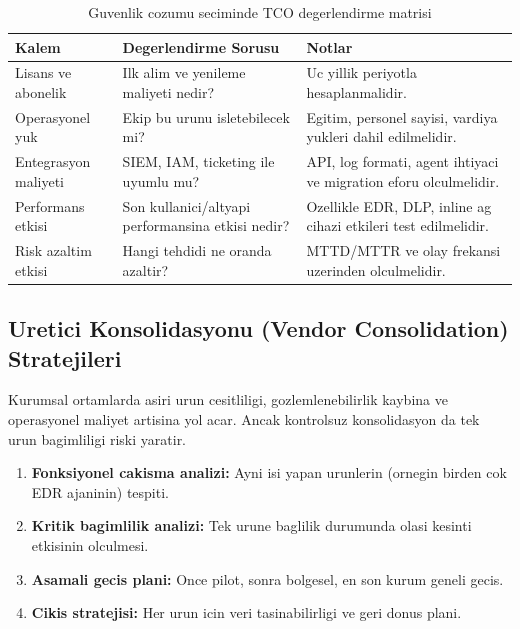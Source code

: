 \begin{table}[htbp]
\centering
\caption{Guvenlik cozumu seciminde TCO degerlendirme matrisi}
\begin{tabular}{|p{3.2cm}|p{4.6cm}|p{6.2cm}|}
\hline
\textbf{Kalem} & \textbf{Degerlendirme Sorusu} & \textbf{Notlar} \\
\hline
Lisans ve abonelik & Ilk alim ve yenileme maliyeti nedir? & Uc yillik periyotla hesaplanmalidir. \\
\hline
Operasyonel yuk & Ekip bu urunu isletebilecek mi? & Egitim, personel sayisi, vardiya yukleri dahil edilmelidir. \\
\hline
Entegrasyon maliyeti & SIEM, IAM, ticketing ile uyumlu mu? & API, log formati, agent ihtiyaci ve migration eforu olculmelidir. \\
\hline
Performans etkisi & Son kullanici/altyapi performansina etkisi nedir? & Ozellikle EDR, DLP, inline ag cihazi etkileri test edilmelidir. \\
\hline
Risk azaltim etkisi & Hangi tehdidi ne oranda azaltir? & MTTD/MTTR ve olay frekansi uzerinden olculmelidir. \\
\hline
\end{tabular}
\end{table}


\subsection{Uretici Konsolidasyonu (Vendor Consolidation) Stratejileri}
Kurumsal ortamlarda asiri urun cesitliligi, gozlemlenebilirlik kaybina ve operasyonel maliyet artisina yol acar.
Ancak kontrolsuz konsolidasyon da tek urun bagimliligi riski yaratir.

\begin{enumerate}
    \item \textbf{Fonksiyonel cakisma analizi:} Ayni isi yapan urunlerin (ornegin birden cok EDR ajaninin) tespiti.
    \item \textbf{Kritik bagimlilik analizi:} Tek urune baglilik durumunda olasi kesinti etkisinin olculmesi.
    \item \textbf{Asamali gecis plani:} Once pilot, sonra bolgesel, en son kurum geneli gecis.
    \item \textbf{Cikis stratejisi:} Her urun icin veri tasinabilirligi ve geri donus plani.
\end{enumerate}

